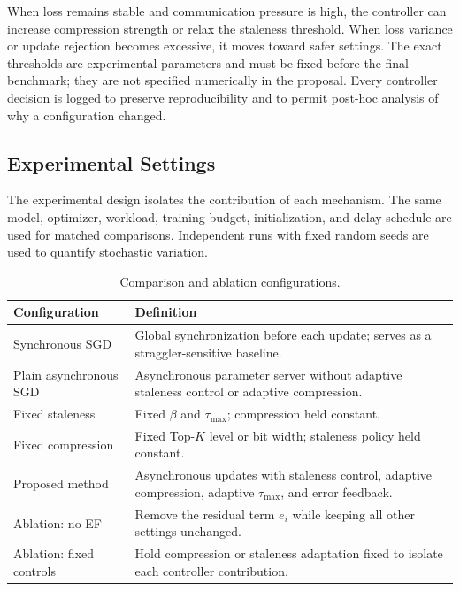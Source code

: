 \documentclass[conference]{IEEEtran}
\begin{document}
When loss remains stable and communication pressure is high, the controller can increase compression strength or relax the staleness threshold. When loss variance or update rejection becomes excessive, it moves toward safer settings. The exact thresholds are experimental parameters and must be fixed before the final benchmark; they are not specified numerically in the proposal. Every controller decision is logged to preserve reproducibility and to permit post-hoc analysis of why a configuration changed.

\subsection{Experimental Settings}
\label{subsec:experiments}

The experimental design isolates the contribution of each mechanism. The same model, optimizer, workload, training budget, initialization, and delay schedule are used for matched comparisons. Independent runs with fixed random seeds are used to quantify stochastic variation.

\begin{table}[t]
\centering
\caption{Comparison and ablation configurations.}
\label{tab:baselines}
\renewcommand{\arraystretch}{1.08}
\begin{tabular}{p{}p{}}
\toprule
\textbf{Configuration} & \textbf{Definition}\\
\midrule
Synchronous SGD & Global synchronization before each update; serves as a straggler-sensitive baseline.\\
Plain asynchronous SGD & Asynchronous parameter server without adaptive staleness control or adaptive compression.\\
Fixed staleness & Fixed $\beta$ and $\tau_{\max}$; compression held constant.\\
Fixed compression & Fixed Top-$K$ level or bit width; staleness policy held constant.\\
Proposed method & Asynchronous updates with staleness control, adaptive compression, adaptive $\tau_{\max}$, and error feedback.\\
Ablation: no EF & Remove the residual term $e_i$ while keeping all other settings unchanged.\\
Ablation: fixed controls & Hold compression or staleness adaptation fixed to isolate each controller contribution.\\
\bottomrule
\end{tabular}
\end{table}
\end{document}
